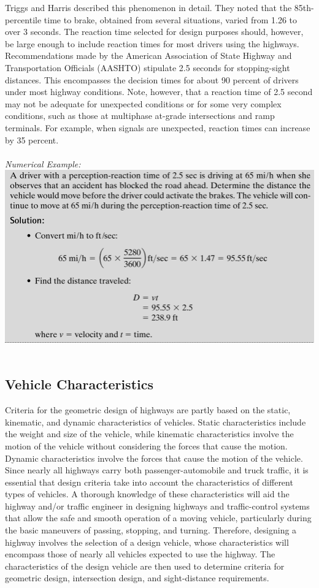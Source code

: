 \par
Triggs and Harris described this phenomenon in detail. They noted that the 85th-percentile time to brake, obtained from several situations, varied from 1.26 to over 3 seconds. The reaction time selected for design purposes should, however, be large enough to include reaction times for most drivers using the highways. Recommendations made by the American Association of State Highway and Transportation Officials (AASHTO) stipulate 2.5 seconds for stopping-sight distances. This encompasses the decision times for about 90 percent of drivers under most highway conditions. Note, however, that a reaction time of 2.5 second may not be adequate for unexpected conditions or for some very complex conditions, such as those at multiphase at-grade intersections and ramp terminals. For example, when signals are unexpected, reaction times can increase by 35 percent.
\\\\
\emph{Numerical Example:}
\\
\includegraphics{gfx/fig4.png}
\\\\
\subsection{Vehicle Characteristics}
Criteria for the geometric design of highways are partly based on the static, kinematic, and dynamic characteristics of vehicles. Static characteristics include the weight and size of the vehicle, while kinematic characteristics involve the motion of the vehicle without considering the forces that cause the motion. Dynamic characteristics involve the forces that cause the motion of the vehicle. Since nearly all highways carry both passenger-automobile and truck traffic, it is essential that design criteria take into account the characteristics of different types of vehicles. A thorough knowledge of these characteristics will aid the highway and/or traffic engineer in designing highways and traffic-control systems that allow the safe and smooth operation of a moving vehicle, particularly during the basic maneuvers of passing, stopping, and turning. Therefore, designing a highway involves the selection of a design vehicle, whose characteristics will encompass those of nearly all vehicles expected to use the highway. The characteristics of the design vehicle are then used to determine criteria for geometric design, intersection design, and sight-distance requirements.

